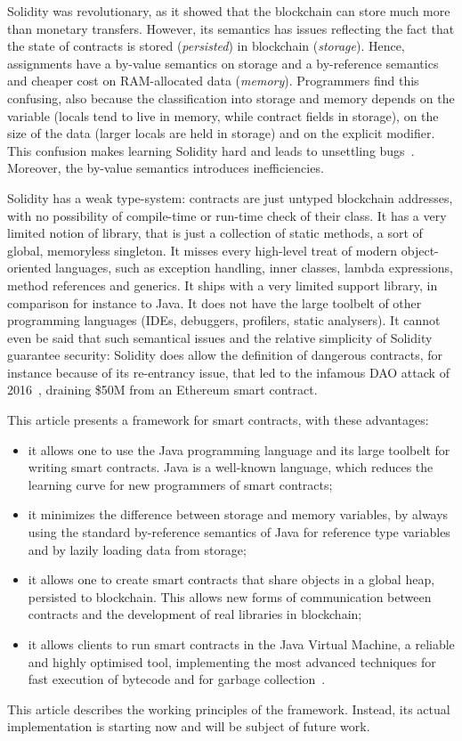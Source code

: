 \documentclass[10pt]{llncs}
\def\codesize{}
\def\<#1>{\codeid{#1}}
\newcommand{\codeid}[1]{\ifmmode{\mbox{\codesize\ttfamily{#1}}}\else{\codesize\ttfamily #1}\fi}
\begin{document}
Solidity was revolutionary, as it showed that the blockchain can
store much more than monetary transfers.
However, its semantics has issues reflecting the fact that
the state of contracts is stored
(\emph{persisted}) in blockchain (\emph{storage}). Hence, assignments have a
by-value semantics on storage and a by-reference semantics and cheaper cost
on RAM-allocated data (\emph{memory}).
Programmers find this confusing, also because
the classification into storage and memory depends on the variable
(locals tend to live in memory, while contract fields in
storage), on the size of the data (larger locals are held in storage)
and on the explicit \<storage> modifier. This confusion makes learning
Solidity hard and leads to
unsettling bugs~\cite{uninitialised_storage_pointers}. Moreover,
the by-value semantics introduces inefficiencies.

Solidity has a weak type-system: contracts
are just untyped blockchain addresses, with no possibility of
compile-time or run-time check of their class.
It has a very limited notion of library, that is just
a collection of static methods,
a sort of global, memoryless singleton.
It misses every high-level treat of modern object-oriented languages,
such as exception handling,
inner classes, lambda expressions, method references and generics.
It ships with a very limited support library, in comparison for
instance to Java. It does not have the large toolbelt of
other programming languages (IDEs, debuggers, profilers,
static analysers).
It cannot even be said that such semantical issues and the
relative simplicity of Solidity
guarantee security: Solidity does
allow the definition of dangerous contracts, for
instance because of its re-entrancy issue, that led to the
infamous DAO attack of 2016~\cite{dao16},
draining \$50M from an Ethereum smart contract.

This article presents a framework for smart contracts, with these advantages:
%
\begin{itemize}
\item it allows one to use the Java programming language and its
  large toolbelt for writing
  smart contracts. Java is a well-known language, which reduces
  the learning curve for new programmers of smart contracts;
\item it minimizes the difference between storage and memory
  variables, by always using the standard by-reference semantics
  of Java for reference type variables and by lazily loading
  data from storage;
\item it allows one to create smart contracts that share objects
  in a global heap, persisted to blockchain. This allows
  new forms of communication between contracts and the
  development of real libraries in blockchain;
\item it allows clients to run smart contracts in the Java Virtual
  Machine, a reliable and highly optimised tool, implementing the most advanced
  techniques for fast execution of bytecode and for garbage
  collection~\cite{LindholmYBB14}.
\end{itemize}
%
This article describes the working principles of the framework. Instead,
its actual implementation
is starting now and will be subject of future work.
\end{document}
